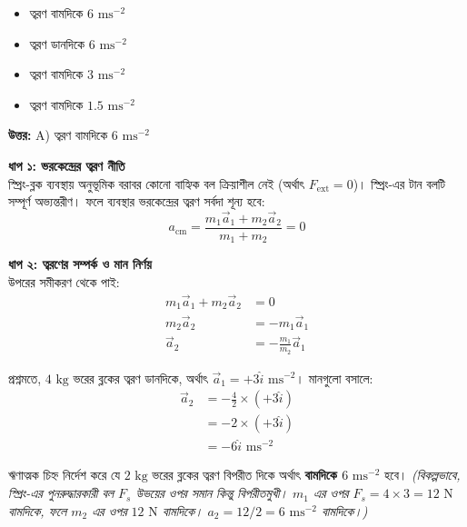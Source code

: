 \documentclass[12pt, a4paper]{article}
\begin{document}
\begin{itemize}[label={}, leftmargin=1cm, itemsep=0.5em]
    \item[\textbf{A)}] ত্বরণ বামদিকে $6\text{ ms}^{-2}$
    \item[\textbf{B)}] ত্বরণ ডানদিকে $6\text{ ms}^{-2}$
    \item[\textbf{C)}] ত্বরণ বামদিকে $3\text{ ms}^{-2}$
    \item[\textbf{D)}] ত্বরণ বামদিকে $1.5\text{ ms}^{-2}$
\end{itemize}

\vspace{0.5em}
\begin{tcolorbox}[answerbox]
    \textbf{\color{success} উত্তর:} A) ত্বরণ বামদিকে $6\text{ ms}^{-2}$
\end{tcolorbox}
\vspace{1em}

\begin{tcolorbox}[solutionbox={সমাধান (Solution)}]
    \noindent
    \textbf{ধাপ ১: ভরকেন্দ্রের ত্বরণ নীতি} \\
    স্প্রিং-ব্লক ব্যবস্থায় অনুভূমিক বরাবর কোনো বাহ্যিক বল ক্রিয়াশীল নেই (অর্থাৎ $F_{\text{ext}} = 0$)। স্প্রিং-এর টান বলটি সম্পূর্ণ অভ্যন্তরীণ। ফলে ব্যবস্থার ভরকেন্দ্রের ত্বরণ সর্বদা শূন্য হবে:
    \[ a_{\text{cm}} = \frac{m_1 \vec{a}_1 + m_2 \vec{a}_2}{m_1 + m_2} = 0 \]
    
    \vspace{0.5em}
    \noindent\textbf{ধাপ ২: ত্বরণের সম্পর্ক ও মান নির্ণয়} \\
    উপরের সমীকরণ থেকে পাই:
    \begin{align*}
        m_1 \vec{a}_1 + m_2 \vec{a}_2 &= 0 \\
        m_2 \vec{a}_2 &= -m_1 \vec{a}_1 \\
        \vec{a}_2 &= -\frac{m_1}{m_2} \vec{a}_1
    \end{align*}
    
    প্রশ্নমতে, $4\text{ kg}$ ভরের ব্লকের ত্বরণ ডানদিকে, অর্থাৎ $\vec{a}_1 = +3\hat{i}\text{ ms}^{-2}$। 
    মানগুলো বসালে:
    \begin{align*}
        \vec{a}_2 &= -\frac{4}{2} \times (+3\hat{i}) \\
        &= -2 \times (+3\hat{i}) \\
        &= -6\hat{i}\text{ ms}^{-2}
    \end{align*}
    
    ঋণাত্মক চিহ্ন নির্দেশ করে যে $2\text{ kg}$ ভরের ব্লকের ত্বরণ বিপরীত দিকে অর্থাৎ \textbf{বামদিকে $6\text{ ms}^{-2}$} হবে। 
    \textit{(বিকল্পভাবে, স্প্রিং-এর পুনরুদ্ধারকারী বল $F_s$ উভয়ের ওপর সমান কিন্তু বিপরীতমুখী। $m_1$ এর ওপর $F_s = 4 \times 3 = 12\text{ N}$ বামদিকে, ফলে $m_2$ এর ওপর $12\text{ N}$ বামদিকে। $a_2 = 12 / 2 = 6\text{ ms}^{-2}$ বামদিকে।)}
\end{tcolorbox}
\end{document}

